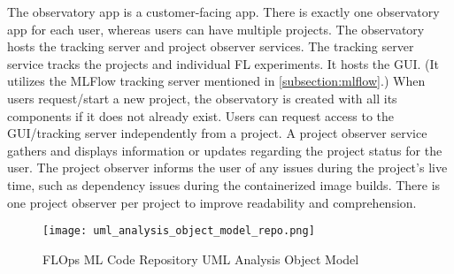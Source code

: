 The observatory app is a customer-facing app.
There is exactly one observatory app for each user, whereas users can have multiple projects.
The observatory hosts the tracking server and project observer services.
The tracking server service tracks the projects and individual FL experiments.
It hosts the GUI. 
(It utilizes the MLFlow tracking server mentioned in \ref{subsection:mlflow}.)
When users request/start a new project, the observatory is created with all its components if it does not already exist.
Users can request access to the GUI/tracking server independently from a project.
A project observer service gathers and displays information or updates regarding the project status for the user.
The project observer informs the user of any issues during the project's live time, such as dependency issues during the containerized image builds.
There is one project observer per project to improve readability and comprehension.

\begin{figure}[h]
    \centering
    \texttt{[image: uml\_analysis\_object\_model\_repo.png]}
    \caption{FLOps ML Code Repository UML Analysis Object Model}
    \label{fig:uml_repo_analysis_object_model}
\end{figure}

